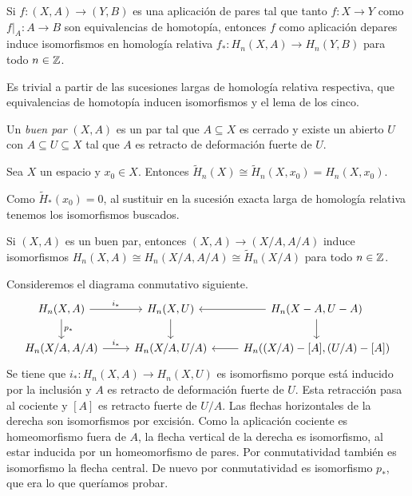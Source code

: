 \documentclass[TA.tex]{subfiles}
\begin{document}
\begin{prop}
Si $f:(X,A)\to (Y,B)$ es una aplicación de pares tal que tanto $f:X\to Y$ como $f|_A:A\to B$ son equivalencias de homotopía, entonces $f$ como aplicación depares induce isomorfismos en homología relativa $f_*:H_n(X,A)\to H_n(Y,B)$ para todo $n\in\mathbb{Z}$.
\end{prop}
\begin{dem}
Es trivial a partir de las sucesiones largas de homología relativa respectiva, que equivalencias de homotopía inducen isomorfismos y el lema de los cinco.
\end{dem}

\begin{defi}
Un \emph{buen par} $(X,A)$ es un par tal que $A\subseteq X$ es cerrado y existe un abierto $U$ con $A\subseteq U\subseteq X$ tal que $A$ es retracto de deformación fuerte de $U$.
\end{defi}


\begin{prop}
Sea $X$ un espacio y $x_0\in X$. Entonces $\widetilde{H}_n(X)\cong\widetilde{H}_n(X,x_0)=H_n(X,x_0)$.
\end{prop}
\begin{dem}
Como $\widetilde{H}_*(x_0)=0$, al sustituir en la sucesión exacta larga de homología relativa tenemos los isomorfismos buscados.
\end{dem}

\begin{prop}\label{2.22}
Si $(X,A)$ es un buen par, entonces $(X,A)\to (X/A,A/A)$ induce isomorfismos $H_n(X,A)\cong H_n(X/A,A/A)\cong\widetilde{H}_n(X/A)$ para todo $n\in\mathbb{Z}$. 
\end{prop}
\begin{dem}
Consideremos el diagrama conmutativo siguiente.
\[
\begin{tikzcd}
H_n(X,A)\arrow[d,"p_*"]\arrow[r,"i_*"] & H_n(X,U)\arrow[d]&H_n(X-A,U-A)\arrow[l]\arrow[d]\\
H_n(X/A,A/A)\arrow[r, "i_*"]& H_n(X/A, U/A) &\arrow[l]H_n((X/A)-[A], (U/A)-[A])
\end{tikzcd}
\]
Se tiene que $i_*:H_n(X,A)\to H_n(X,U) $ es isomorfismo porque está inducido por la inclusión y $A$ es retracto de deformación fuerte de $U$. Esta retracción pasa al cociente y $[A]$ es retracto fuerte de $U/A$. Las flechas horizontales de la derecha son isomorfismos por excisión. Como la aplicación cociente es homeomorfismo fuera de $A$, la flecha vertical de la derecha es isomorfismo, al estar inducida por un homeomorfismo de pares. Por conmutatividad también es isomorfismo la flecha central. De nuevo por conmutatividad es isomorfismo $p_*$, que era lo que queríamos probar. 
\end{dem}
\end{document}
